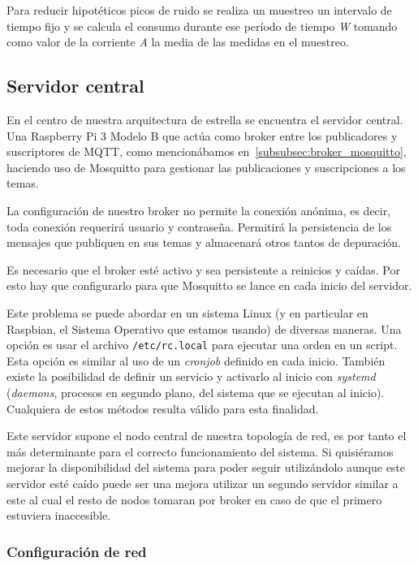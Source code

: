 \documentclass[a4paper,10pt]{article}
\begin{document}
Para reducir hipotéticos picos de ruido se realiza un muestreo un
intervalo de tiempo fijo y se calcula el consumo durante ese período
de tiempo \textit{W} tomando como valor de la corriente \textit{A} la
media de las medidas en el muestreo.

\newpage

\subsection{Servidor central}\label{subsec:servidor-central}

En el centro de nuestra arquitectura de estrella se encuentra el
servidor central. Una Raspberry Pi 3 Modelo B que actúa como broker
entre los publicadores y suscriptores de MQTT, como mencionábamos
en~\ref{subsubsec:broker_mosquitto}, haciendo uso de Mosquitto para
gestionar las publicaciones y suscripciones a los temas.

La configuración de nuestro broker no permite la conexión anónima, es
decir, toda conexión requerirá usuario y contraseña. Permitirá la
persistencia de los mensajes que publiquen en sus temas y almacenará
otros tantos de depuración.

Es necesario que el broker esté activo y sea persistente a reinicios y
caídas. Por esto hay que configurarlo para que Mosquitto se lance en
cada inicio del servidor.

Este problema se puede abordar en un sistema Linux (y en particular en
Raspbian, el Sistema Operativo que estamos usando) de diversas
maneras. Una opción es usar el archivo \texttt{/etc/rc.local} para
ejecutar una orden en un script. Esta opción es similar al uso de un
\textit{cronjob} definido en cada inicio. También existe la
posibilidad de definir un servicio y activarlo al inicio con
\textit{systemd} (\textit{daemons}, procesos en segundo plano, del
sistema que se ejecutan al inicio). Cualquiera de estos métodos
resulta válido para esta finalidad.

Este servidor supone el nodo central de nuestra topología de red, es
por tanto el más determinante para el correcto funcionamiento del
sistema. Si quisiéramos mejorar la disponibilidad del sistema para
poder seguir utilizándolo aunque este servidor esté caído puede ser
una mejora utilizar un segundo servidor similar a este al cual el
resto de nodos tomaran por broker en caso de que el primero estuviera
inaccesible.

\subsubsection{Configuración de red}
\end{document}
